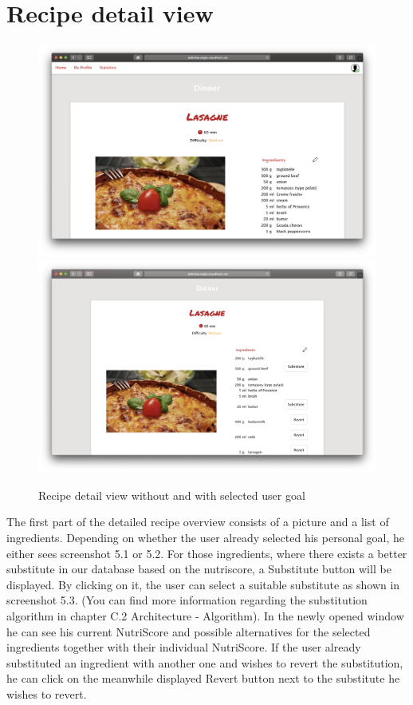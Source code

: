 \section*{Recipe detail view}
\vspace{-1em}
\begin{figure}[H]
	\captionsetup{justification=centering}
	\centering
		\includegraphics[scale=0.25]{Ressourcen/img/screenshots/screenshotH.png}
		\includegraphics[scale=0.25]{Ressourcen/img/screenshots/screenshotI.png}
		\vspace{-1em}
		\caption{Recipe detail view without and with selected user goal}
\end{figure}
\vspace{-2em}
The first part of the detailed recipe overview consists of a picture and a list of ingredients. Depending on whether the user already selected his personal goal, he either sees screenshot 5.1 or 5.2. For those ingredients, where there exists a better substitute in our database based on the nutriscore, a Substitute button will be displayed. By clicking on it, the user can select a suitable substitute as shown in screenshot 5.3. (You can find more information regarding the substitution algorithm in chapter C.2 Architecture - Algorithm). In the newly opened window he can see his current NutriScore and possible alternatives for the selected ingredients together with their individual NutriScore. If the user already substituted an ingredient with another one and wishes to revert the substitution, he can click on the meanwhile displayed Revert button next to the substitute he wishes to revert. 
